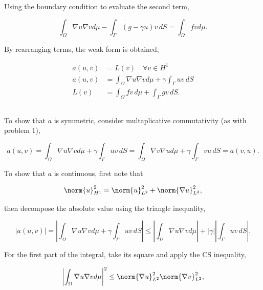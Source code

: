 \documentclass{hw-template}
\newcommand{\intOm}{\int_{\Omega}}
\newcommand{\hOne}{{H^1}}
\newcommand{\ltwo}{{L^2}}
\begin{document}
Using the boundary condition to evaluate the second term,

\begin{equation}
    \intOm \nabla u \nabla v d\mu - \int_{\Gamma} (g - \gamma u)v\, dS= \intOm fv d\mu.
\end{equation}

By rearranging terms, the weak form is obtained,

\begin{align}
    a(u, v) &= L(v) \quad \forall v \in \hOne\\
    a(u, v) &= \intOm \nabla u \nabla v d\mu + \gamma\int_{\Gamma}   uv\, dS\\
    L(v) &= \intOm fv\, d\mu + \int_{\Gamma} gv \, dS.
\end{align}

\subsection{}

To show that $a$ is symmetric, consider multaplicative commutativity (as with problem 1),

\begin{equation}
    a(u, v) = \intOm \nabla u \nabla v d\mu + \gamma\int_{\Gamma}   uv\, dS = \intOm \nabla v \nabla u d\mu + \gamma\int_{\Gamma}   vu\, dS = a(v, u).
\end{equation}

To show that $a$ is continuous, first note that 

\begin{equation}
    \norm{u}_\hOne^2 = \norm{u}_\ltwo^2 + \norm{\nabla u}_\ltwo^2,\label{eq:p3-inequality}
\end{equation}

then decompose the absolute value using the triangle inequality,

\begin{equation}
    |a(u, v)| = \left|\intOm \nabla u \nabla v d\mu + \gamma\int_{\Gamma}   uv\, dS \right| \leq \left| \intOm \nabla u \nabla v d\mu\right| + |\gamma|\left|\int_{\Gamma}   uv\, dS \right|.\label{eq:triangle}
\end{equation}

For the first part of the integral, take its square and apply the CS inequality,

\begin{equation}
    \left|\intOm \nabla u \nabla v d\mu  \right|^2 \leq \norm{\nabla u }^2_\ltwo \norm{\nabla v}^2_\ltwo,
\end{equation}
\end{document}
